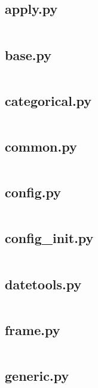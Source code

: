 \documentclass{article}
\begin{document}
\subsection{apply.py}
\inputminted{python}{/home/dufferzafar/dev/@clones/pandas/pandas/core/apply.py}
\newpage

\subsection{base.py}
\inputminted{python}{/home/dufferzafar/dev/@clones/pandas/pandas/core/base.py}
\newpage

\subsection{categorical.py}
\inputminted{python}{/home/dufferzafar/dev/@clones/pandas/pandas/core/categorical.py}
\newpage

\subsection{common.py}
\inputminted{python}{/home/dufferzafar/dev/@clones/pandas/pandas/core/common.py}
\newpage

\subsection{config.py}
\inputminted{python}{/home/dufferzafar/dev/@clones/pandas/pandas/core/config.py}
\newpage

\subsection{config\_init.py}
\inputminted{python}{/home/dufferzafar/dev/@clones/pandas/pandas/core/config_init.py}
\newpage

\subsection{datetools.py}
\inputminted{python}{/home/dufferzafar/dev/@clones/pandas/pandas/core/datetools.py}
\newpage

\subsection{frame.py}
\inputminted{python}{/home/dufferzafar/dev/@clones/pandas/pandas/core/frame.py}
\newpage

\subsection{generic.py}
\inputminted{python}{/home/dufferzafar/dev/@clones/pandas/pandas/core/generic.py}
\newpage
\end{document}

